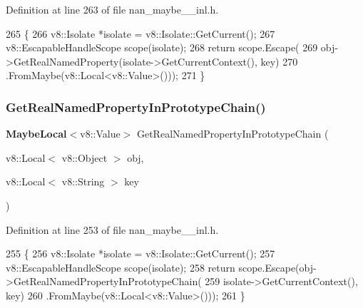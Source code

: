 Definition at line 263 of file nan\+\_\+maybe\+\_\+\_\+inl.\+h.


\begin{DoxyCode}
265                            \{
266   v8::Isolate *isolate = v8::Isolate::GetCurrent();
267   v8::EscapableHandleScope scope(isolate);
268   \textcolor{keywordflow}{return} scope.Escape(
269       obj->GetRealNamedProperty(isolate->GetCurrentContext(), key)
270           .FromMaybe(v8::Local<v8::Value>()));
271 \}
\end{DoxyCode}
\mbox{\label{nan__maybe__43__inl_8h_a43c43f842df86178dfab14867bb75b3d}} 
\subsubsection{Get\+Real\+Named\+Property\+In\+Prototype\+Chain()}
{\footnotesize\ttfamily \textbf{ Maybe\+Local}$<$v8\+::\+Value$>$ Get\+Real\+Named\+Property\+In\+Prototype\+Chain (\begin{DoxyParamCaption}\item[{v8\+::\+Local$<$ v8\+::\+Object $>$}]{obj,  }\item[{v8\+::\+Local$<$ v8\+::\+String $>$}]{key }\end{DoxyParamCaption})}



Definition at line 253 of file nan\+\_\+maybe\+\_\+\_\+inl.\+h.


\begin{DoxyCode}
255                            \{
256   v8::Isolate *isolate = v8::Isolate::GetCurrent();
257   v8::EscapableHandleScope scope(isolate);
258   \textcolor{keywordflow}{return} scope.Escape(obj->GetRealNamedPropertyInPrototypeChain(
259                              isolate->GetCurrentContext(), key)
260                           .FromMaybe(v8::Local<v8::Value>()));
261 \}
\end{DoxyCode}
\mbox{\label{nan__maybe__43__inl_8h_a96e595dcf3def7ab6422eee8d90a4879}} 
